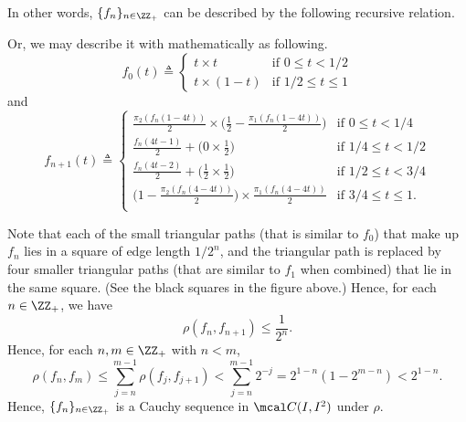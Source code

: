 \documentclass[MAS331_Note.tex]{subfiles}
\begin{document}
{    \noindent
    In other words, $\{f_n\}_{n \in \ZZ_+}$ can be described by
    the following recursive relation.
    \begin{center}
    \end{center}

    \noindent
    Or, we may describe it with mathematically as following.
    \[
        f_0(t) \triangleq \begin{cases}
            t \times t & \text{if } 0 \le t < 1/2 \\
            t \times (1-t) & \text{if } 1/2 \le t \le 1
        \end{cases}
    \]
    and
    \[
        f_{n+1}(t) \triangleq \begin{cases}
            \frac{\pi_2(f_n(1-4t))}{2} \times \big(\frac{1}{2}-\frac{\pi_1(f_n(1-4t))}{2}\big)
            & \text{if } 0 \le t < 1/4 \\
            \frac{f_n(4t-1)}{2}+\big(0\times\frac{1}{2}\big)
            & \text{if } 1/4 \le t < 1/2 \\
            \frac{f_n(4t-2)}{2}+\big(\frac{1}{2}\times\frac{1}{2}\big)
            & \text{if } 1/2 \le t < 3/4 \\
            \big(1-\frac{\pi_2(f_n(4-4t))}{2}\big) \times \frac{\pi_1(f_n(4-4t))}{2}
            & \text{if } 3/4 \le t \le 1\text{.} \\
        \end{cases}
    \]

    Note that each of the small triangular paths (that is similar to $f_0$)
    that make up $f_n$ lies in
    a square of edge length $1/2^n$, and the triangular path is replaced by
    four smaller triangular paths (that are similar to $f_1$ when combined)
    that lie in the same square. (See the black squares in the figure above.)
    Hence, for each $n \in \ZZ_+$, we have
    \[
        \rho(f_n, f_{n+1}) \le \frac{1}{2^n}\text{.}
    \]
    Hence, for each $n, m \in \ZZ_+$ with $n < m$,
    \[
        \rho(f_n, f_m) \le \sum_{j=n}^{m-1} \rho(f_j, f_{j+1})
        < \sum_{j=n}^{m-1} 2^{-j} = 2^{1-n}(1-2^{m-n}) < 2^{1-n}\text{.}
    \]
    Hence, $\{f_n\}_{n \in \ZZ_+}$ is a Cauchy sequence in $\mcal C(I, I^2)$
    under $\rho$.
    
}
\end{document}
